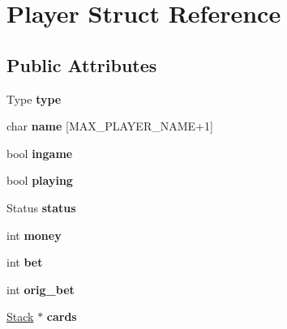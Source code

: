 \hypertarget{struct_player}{\section{Player Struct Reference}
\label{struct_player}
}
\subsection*{Public Attributes}
\begin{DoxyCompactItemize}
\item 
\hypertarget{struct_player_ab5e761448af3c9e17032d6d2f98b2395}{Type {\bfseries type}}\label{struct_player_ab5e761448af3c9e17032d6d2f98b2395}

\item 
\hypertarget{struct_player_afd8e85a94690b3f972effa10d9a200d7}{char {\bfseries name} \mbox{[}M\-A\-X\-\_\-\-P\-L\-A\-Y\-E\-R\-\_\-\-N\-A\-M\-E+1\mbox{]}}\label{struct_player_afd8e85a94690b3f972effa10d9a200d7}

\item 
\hypertarget{struct_player_a222fc66035409f3ee123f1917ecf077e}{bool {\bfseries ingame}}\label{struct_player_a222fc66035409f3ee123f1917ecf077e}

\item 
\hypertarget{struct_player_a93eaebe50e6ab8a19c35138b4c60f60c}{bool {\bfseries playing}}\label{struct_player_a93eaebe50e6ab8a19c35138b4c60f60c}

\item 
\hypertarget{struct_player_aeb08943a32834515e66222d2e948292d}{Status {\bfseries status}}\label{struct_player_aeb08943a32834515e66222d2e948292d}

\item 
\hypertarget{struct_player_a9545beef70350d5c3b3a5719a890dd2f}{int {\bfseries money}}\label{struct_player_a9545beef70350d5c3b3a5719a890dd2f}

\item 
\hypertarget{struct_player_a9ad8e498594182ced9e8091de332f6d0}{int {\bfseries bet}}\label{struct_player_a9ad8e498594182ced9e8091de332f6d0}

\item 
\hypertarget{struct_player_a7023b1477151f0032f1b1c4c059c3d89}{int {\bfseries orig\-\_\-bet}}\label{struct_player_a7023b1477151f0032f1b1c4c059c3d89}

\item 
\hypertarget{struct_player_a883614daaa31bb61cc576cef4c646959}{\hyperlink{struct_stack}{Stack} $\ast$ {\bfseries cards}}\label{struct_player_a883614daaa31bb61cc576cef4c646959}


\end{DoxyCompactItemize}

